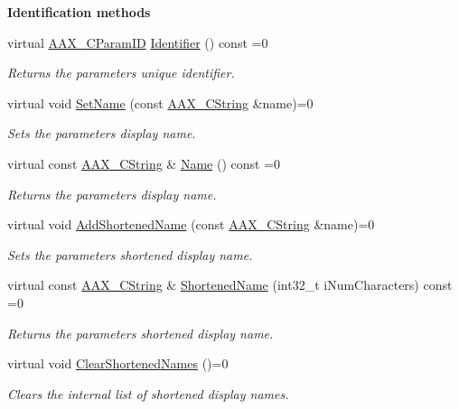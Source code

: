 \begin{Indent}{\bf Identification methods}\par
\begin{DoxyCompactItemize}
\item 
virtual \hyperlink{a00149_a1440c756fe5cb158b78193b2fc1780d1}{A\+A\+X\+\_\+\+C\+Param\+I\+D} \hyperlink{a00108_a28807db424a720daa9880ed9ee5d4d21}{Identifier} () const =0
\begin{DoxyCompactList}\small\item\em Returns the parameter\textquotesingle{}s unique identifier. \end{DoxyCompactList}\item 
virtual void \hyperlink{a00108_a480e9947cdaee6f26ca2bbaeb9de56b2}{Set\+Name} (const \hyperlink{a00042}{A\+A\+X\+\_\+\+C\+String} \&name)=0
\begin{DoxyCompactList}\small\item\em Sets the parameter\textquotesingle{}s display name. \end{DoxyCompactList}\item 
virtual const \hyperlink{a00042}{A\+A\+X\+\_\+\+C\+String} \& \hyperlink{a00108_ae1dae8844a16492726cb6caac7e2e822}{Name} () const =0
\begin{DoxyCompactList}\small\item\em Returns the parameter\textquotesingle{}s display name. \end{DoxyCompactList}\item 
virtual void \hyperlink{a00108_a642ce0054e136c75fe402ebd53a4eb90}{Add\+Shortened\+Name} (const \hyperlink{a00042}{A\+A\+X\+\_\+\+C\+String} \&name)=0
\begin{DoxyCompactList}\small\item\em Sets the parameter\textquotesingle{}s shortened display name. \end{DoxyCompactList}\item 
virtual const \hyperlink{a00042}{A\+A\+X\+\_\+\+C\+String} \& \hyperlink{a00108_a729ead00bf12103793557f39a01f782c}{Shortened\+Name} (int32\+\_\+t i\+Num\+Characters) const =0
\begin{DoxyCompactList}\small\item\em Returns the parameter\textquotesingle{}s shortened display name. \end{DoxyCompactList}\item 
virtual void \hyperlink{a00108_ae8601be6754169f626269f81f38b4581}{Clear\+Shortened\+Names} ()=0
\begin{DoxyCompactList}\small\item\em Clears the internal list of shortened display names. \end{DoxyCompactList}\end{DoxyCompactItemize}
\end{Indent}
